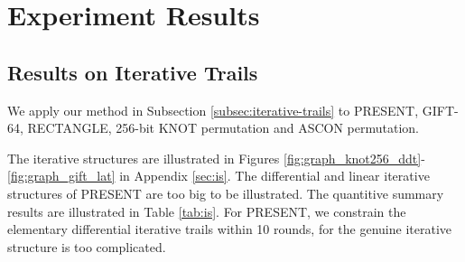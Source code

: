 \section{Experiment Results\label{sec:experiment}}

\subsection{Results on Iterative Trails}

We apply our method in Subsection \ref{subsec:iterative-trails} to PRESENT, GIFT-64, RECTANGLE, 256-bit KNOT permutation and ASCON permutation. 



The iterative structures are illustrated in Figures \ref{fig:graph_knot256_ddt}-\ref{fig:graph_gift_lat} in Appendix \ref{sec:is}. The differential and linear iterative structures of PRESENT are too big to be illustrated. The quantitive summary results are illustrated in Table \ref{tab:is}. For PRESENT, we constrain the elementary differential iterative trails within 10 rounds, for the genuine iterative structure is too complicated.

